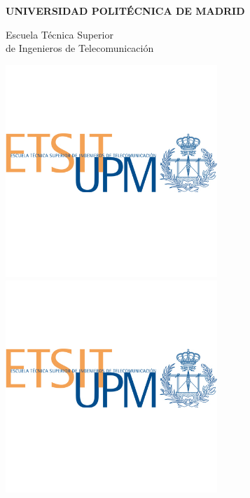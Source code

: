 \thispagestyle{empty}
\large
\vspace{3cm}
\begin{center}

  \Huge\textbf{UNIVERSIDAD POLITÉCNICA DE MADRID}

  \vspace{1cm}

  \huge{Escuela Técnica Superior\\de Ingenieros de Telecomunicación} 

  \vspace{1cm}

{
  \includegraphics[width=80mm]{logos/logoetsit_tamano.jpg}
}
{
  \includegraphics[width=80mm]{logos/logoetsit_tamano-cmyk.jpg}
}


  
  
  \LARGE\textbf{\mybooktitle}
  
  
  \mybookauthor

  \vspace{5mm}

  \mybookauthordegree

  \vspace{1cm}

\end{center}

\begin{bottomparagraph}
  \begin{center}
    \huge{\mybookyear}
  \end{center}
\end{bottomparagraph}


\clearemptydoublepage

